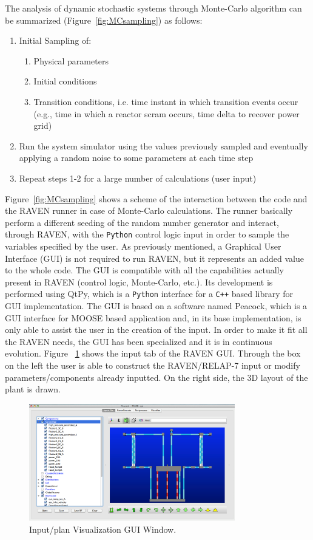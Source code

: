 \documentclass{mc2013}
\begin{document}
The analysis of dynamic stochastic systems through Monte-Carlo algorithm can be summarized (Figure~\ref{fig:MCsampling}) as follows:
\begin{enumerate}
\item Initial Sampling of:
       \begin{enumerate}
       \item Physical parameters
       \item Initial conditions
       \item Transition conditions, i.e. time instant in which transition events occur (e.g., time in which a reactor scram occurs, time delta to recover power grid)
    \end{enumerate}
\item Run the system simulator using the values previously sampled and eventually applying a random noise to some parameters at each time step
\item Repeat steps 1-2 for a large number of calculations (user input)
\end{enumerate}
Figure~\ref{fig:MCsampling} shows a scheme of the interaction between the code and the RAVEN runner in case of Monte-Carlo calculations. The runner basically perform a different seeding of the random number generator and interact, through RAVEN, with the \verb!Python! control logic input in order to sample the variables specified by the user.
\label{sec:GUI}
As previously mentioned, a Graphical User Interface (GUI) is not required to run RAVEN, but it represents an added value to the whole code. The GUI is compatible with all the capabilities actually present in RAVEN (control logic, Monte-Carlo, etc.).  Its development is performed using QtPy, which is a \verb!Python! interface for a \verb!C++! based library  for GUI implementation. The GUI is based on a software named Peacock, which is a GUI interface for MOOSE based application and, in its base implementation, is only able to assist the user in the creation of the input.  In order to make it fit all the RAVEN needs, the GUI has been specialized and it is in continuous evolution. Figure ~\ref{fig:RavenGUI} shows the input tab of the RAVEN GUI. Through the box on the left the user is able to construct the RAVEN/RELAP-7 input or modify parameters/components already inputted. On the right side, the 3D layout of the plant is drawn. 
\begin{figure}[h]
   \centering
    \includegraphics[width=0.8\textwidth]{figures/RavenGUI.PNG}
    \caption{Input/plan Visualization GUI Window.}
    \label{fig:RavenGUI}
\end{figure}
\end{document}
